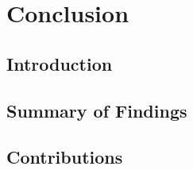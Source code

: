 
\chapter{Conclusion}

\section{Introduction}



\section{Summary of Findings}





\section{Contributions}

